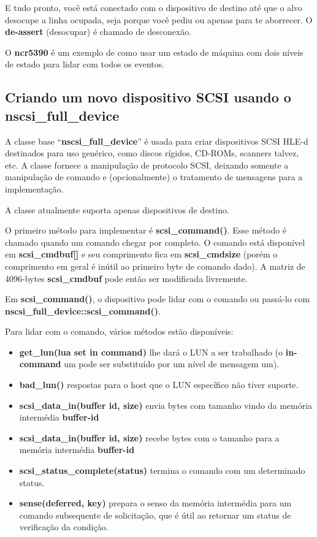 \documentclass[letterpaper,10pt,brazil]{sphinxmanual}
\begin{document}
E tudo pronto, você está conectado com o dispositivo de destino até que
o alvo desocupe a linha ocupada, seja porque você pediu ou apenas para
te aborrecer. O \textbf{de-assert} (desocupar) é chamado de desconexão.

O \textbf{ncr5390} é um exemplo de como usar um estado de máquina com dois
níveis de estado para lidar com todos os eventos.


\subsection{Criando um novo dispositivo SCSI usando o \textbf{nscsi\_full\_device}}
\label{techspecs/nscsi:criando-um-novo-dispositivo-scsi-usando-o-nscsi-full-device}
A classe base ``\textbf{nscsi\_full\_device}'' é usada para criar dispositivos
SCSI HLE-d destinados para uso genérico, como discos rígidos, CD-ROMs,
scanners talvez, etc. A classe fornece a manipulação de protocolo SCSI,
deixando somente a manipulação de comando e (opcionalmente) o tratamento
de mensagens para a implementação.

A classe atualmente suporta apenas dispositivos de destino.

O primeiro método para implementar é \textbf{scsi\_command()}. Esse método é
chamado quando um comando chegar por completo. O comando está disponível
em \textbf{scsi\_cmdbuf{[}{]}} e seu comprimento fica em \textbf{scsi\_cmdsize} (porém o
comprimento em geral é inútil ao primeiro byte de comando dado).
A matriz de 4096-bytes \textbf{scsi\_cmdbuf} pode então ser modificada
livremente.

Em \textbf{scsi\_command()}, o dispositivo pode lidar com o comando ou
passá-lo com \textbf{nscsi\_full\_device::scsi\_command()}.

Para lidar com o comando, vários métodos estão disponíveis:
\begin{itemize}
\item {} 
\textbf{get\_lun(lua set in command)} lhe dará o LUN a ser trabalhado (o
\textbf{in-command} um pode ser substituído por um nível de mensagem um).

\item {} 
\textbf{bad\_lun()} respostas para o host que o LUN específico não tiver
suporte.

\item {} 
\textbf{scsi\_data\_in(buffer id, size)} envia bytes com tamanho vindo da
memória intermédia \textbf{buffer-id}

\item {} 
\textbf{scsi\_data\_in(buffer id, size)} recebe bytes com o tamanho para a
memória intermédia \textbf{buffer-id}

\item {} 
\textbf{scsi\_status\_complete(status)} termina o comando com um determinado
status.

\item {} 
\textbf{sense(deferred, key)} prepara o senso da memória intermédia para um
comando subsequente de solicitação, que é útil ao retornar um status
de verificação da condição.

\end{itemize}
\end{document}
